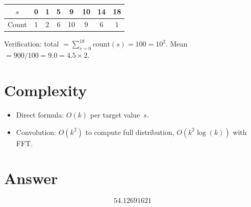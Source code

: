 \documentclass[11pt]{article}
\begin{document}
\begin{center}
\begin{tabular}{cccccccc}
\toprule
$s$ & 0 & 1 & 5 & 9 & 10 & 14 & 18 \\
\midrule
Count & 1 & 2 & 6 & 10 & 9 & 6 & 1 \\
\bottomrule
\end{tabular}
\end{center}

Verification: total $= \sum_{s=0}^{18} \text{count}(s) = 100 = 10^2$. Mean $= 900/100 = 9.0 = 4.5 \times 2$.

\section{Complexity}

\begin{itemize}
\item Direct formula: $O(k)$ per target value~$s$.
\item Convolution: $O(k^2)$ to compute full distribution, $O(k^2 \log(k))$ with FFT.
\end{itemize}

\section{Answer}

\[
\boxed{54.12691621}
\]
\end{document}
